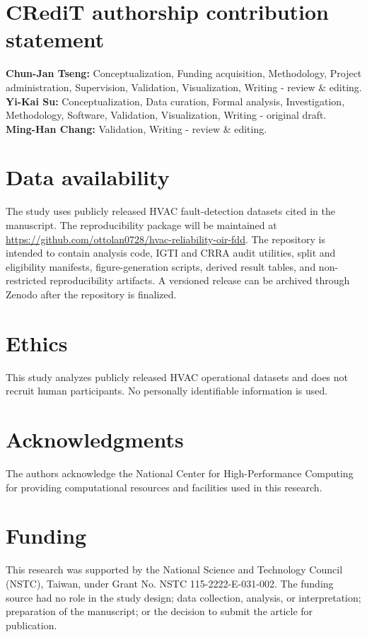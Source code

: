 \documentclass[preprint,12pt]{elsarticle}
\begin{document}
\section*{CRediT authorship contribution statement}
\textbf{Chun-Jan Tseng:} Conceptualization, Funding acquisition, Methodology, Project administration, Supervision, Validation, Visualization, Writing - review \& editing.\\
\textbf{Yi-Kai Su:} Conceptualization, Data curation, Formal analysis, Investigation, Methodology, Software, Validation, Visualization, Writing - original draft.\\
\textbf{Ming-Han Chang:} Validation, Writing - review \& editing.

\section*{Data availability}
The study uses publicly released HVAC fault-detection datasets cited in the manuscript. The reproducibility package will be maintained at \url{https://github.com/ottolan0728/hvac-reliability-oir-fdd}. The repository is intended to contain analysis code, IGTI and CRRA audit utilities, split and eligibility manifests, figure-generation scripts, derived result tables, and non-restricted reproducibility artifacts. A versioned release can be archived through Zenodo after the repository is finalized.

\section*{Ethics}
This study analyzes publicly released HVAC operational datasets and does not recruit human participants. No personally identifiable information is used.

\section*{Acknowledgments}
The authors acknowledge the National Center for High-Performance Computing for providing computational resources and facilities used in this research.

\section*{Funding}
This research was supported by the National Science and Technology Council (NSTC), Taiwan, under Grant No. NSTC 115-2222-E-031-002. The funding source had no role in the study design; data collection, analysis, or interpretation; preparation of the manuscript; or the decision to submit the article for publication.
\end{document}
